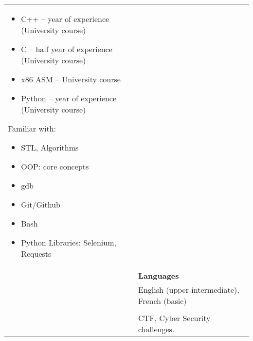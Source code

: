 \documentclass[letterpaper, 11pt]{article}
\begin{document}
\begin{longtable}{p{1.3in}p{4.8in}}
\begin{itemize}[noitemsep, leftmargin=*]
    \item C++ -- year of experience (University course)
    \item C -- half year of experience (University course)
    \item x86 ASM -- University course
    \item Python -- year of experience (University course)
\end{itemize}
Familiar with: 
\begin{itemize}[noitemsep, leftmargin=*]
    \item STL, Algorithms
    \item OOP: core concepts
    \item gdb
    \item Git/Github
    \item Bash
    \item Python Libraries: Selenium, Requests

\end{itemize}
\\
& \textbf{Languages} \\
& English (upper-intermediate), French (basic) \\
& \\




\nohyphens{\color{OliveGreen}{Other interests}} & CTF, Cyber Security challenges.\\


\end{longtable}
\end{document}
